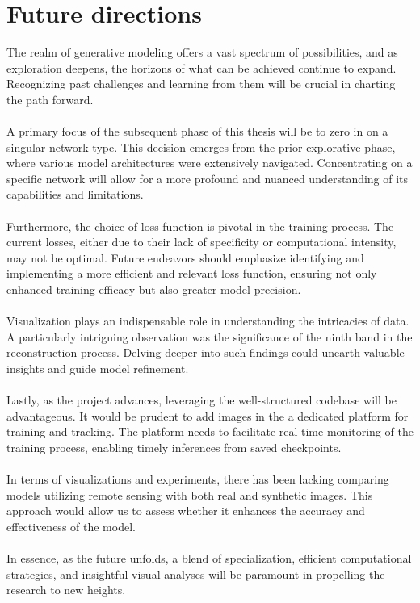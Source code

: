 \section{Future directions}
The realm of generative modeling offers a vast spectrum of possibilities, and as exploration deepens, the horizons of what can be achieved continue to expand. Recognizing past challenges and learning from them will be crucial in charting the path forward.
\\
\\
A primary focus of the subsequent phase of this thesis will be to zero in on a singular network type. This decision emerges from the prior explorative phase, where various model architectures were extensively navigated. Concentrating on a specific network will allow for a more profound and nuanced understanding of its capabilities and limitations.
\\
\\
Furthermore, the choice of loss function is pivotal in the training process. The current losses, either due to their lack of specificity or computational intensity, may not be optimal. Future endeavors should emphasize identifying and implementing a more efficient and relevant loss function, ensuring not only enhanced training efficacy but also greater model precision.
\\
\\
Visualization plays an indispensable role in understanding the intricacies of data. A particularly intriguing observation was the significance of the ninth band in the reconstruction process. Delving deeper into such findings could unearth valuable insights and guide model refinement.
\\
\\
Lastly, as the project advances, leveraging the well-structured codebase will be advantageous. It would be prudent to add images in the a dedicated platform for training and tracking. The platform needs to facilitate real-time monitoring of the training process, enabling timely inferences from saved checkpoints.
\\
\\
In terms of visualizations and experiments, there has been lacking comparing models utilizing remote sensing with both real and synthetic images. This approach would allow us to assess whether it enhances the accuracy and effectiveness of the model.
\\
\\
In essence, as the future unfolds, a blend of specialization, efficient computational strategies, and insightful visual analyses will be paramount in propelling the research to new heights.
